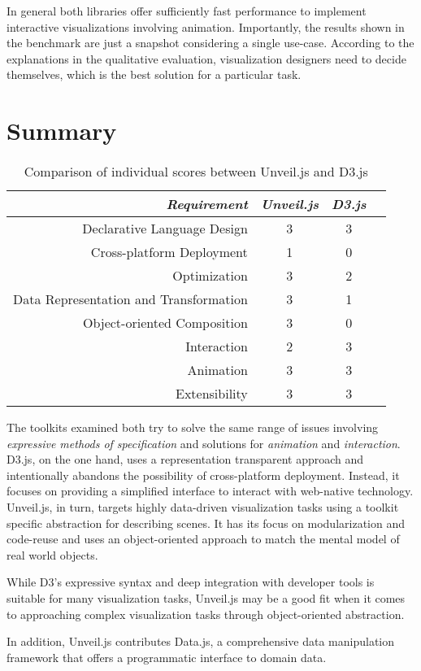 In general both libraries offer sufficiently fast performance to implement interactive visualizations involving animation. Importantly, the results shown in the benchmark are just a snapshot considering a single use-case. According to the explanations in the qualitative evaluation, visualization designers need to decide themselves, which is the best solution for a particular task.

\section{Summary}

\begin{table}
\caption{Comparison of individual scores between Unveil.js and D3.js}
\label{tab:comparison}
\centering
\setlength{\tabcolsep}{5mm} %
\def\arraystretch{1.0} %
\begin{tabular}{|r||c|c|c|} \hline
\emph{Requirement} & \emph{Unveil.js} & \emph{D3.js}\\
\hline\hline
Declarative Language Design & 3 & 3\\
\hline
Cross-platform Deployment & 1 & 0\\
\hline
Optimization & 3 & 2\\
\hline
Data Representation and Transformation & 3 & 1 \\
\hline
Object-oriented Composition & 3 & 0 \\
\hline
Interaction & 2 & 3 \\
\hline
Animation & 3 & 3 \\
\hline
Extensibility & 3 & 3 \\
\hline
\end{tabular}
\end{table}

The toolkits examined both try to solve the same range of issues involving \emph{expressive methods of specification} and solutions for \emph{animation} and \emph{interaction}. D3.js, on the one hand, uses a representation transparent approach and intentionally abandons the possibility of cross-platform deployment. Instead, it focuses on providing a simplified interface to interact with web-native technology. Unveil.js, in turn, targets highly data-driven visualization tasks using a toolkit specific abstraction for describing scenes. It has its focus on modularization and code-reuse and uses an object-oriented approach to match the mental model of real world objects. 




While D3's expressive syntax and deep integration with developer tools is suitable for many visualization tasks, Unveil.js may be a good fit when it comes to approaching complex visualization tasks through object-oriented abstraction.

In addition, Unveil.js contributes Data.js, a comprehensive data manipulation framework that offers a programmatic interface to domain data.